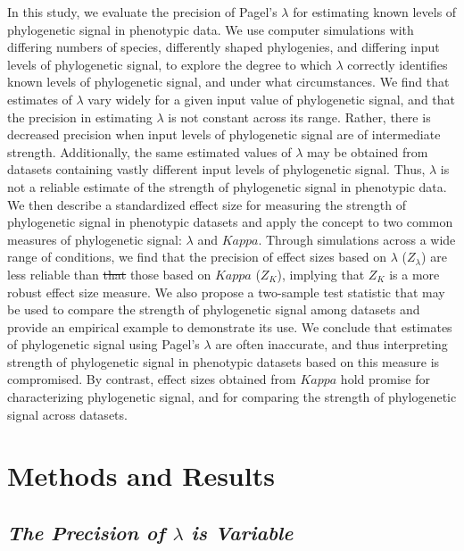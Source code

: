 \documentclass[
]{article}
\begin{document}
In this study, we evaluate the precision of Pagel's \(\lambda\) for
estimating known levels of phylogenetic signal in phenotypic data. We
use computer simulations with differing numbers of species, differently
shaped phylogenies, and differing input levels of phylogenetic signal,
to explore the degree to which \(\lambda\) correctly identifies known
levels of phylogenetic signal, and under what circumstances. We find
that estimates of \(\lambda\) vary widely for a given input value of
phylogenetic signal, and that the precision in estimating \(\lambda\) is
not constant across its range. Rather, there is decreased precision when
input levels of phylogenetic signal are of intermediate strength.
Additionally, the same estimated values of \(\lambda\) may be obtained
from datasets containing vastly different input levels of phylogenetic
signal. Thus, \(\lambda\) is not a reliable estimate of the strength of
phylogenetic signal in phenotypic data. We then describe a standardized
effect size for measuring the strength of phylogenetic signal in
phenotypic datasets and apply the concept to two common measures of
phylogenetic signal: \(\lambda\) and \(Kappa\). Through simulations
across a wide range of conditions, we find that the precision of effect
sizes based on \(\lambda\) (\(Z_{\lambda}\)) are less reliable than
\sout{that} those based on \(Kappa\) (\(Z_K\)), implying that \(Z_K\) is
a more robust effect size measure. We also propose a two-sample test
statistic that may be used to compare the strength of phylogenetic
signal among datasets and provide an empirical example to demonstrate
its use. We conclude that estimates of phylogenetic signal using Pagel's
\(\lambda\) are often inaccurate, and thus interpreting strength of
phylogenetic signal in phenotypic datasets based on this measure is
compromised. By contrast, effect sizes obtained from \(Kappa\) hold
promise for characterizing phylogenetic signal, and for comparing the
strength of phylogenetic signal across datasets.

\hypertarget{methods-and-results}{%
\section{Methods and Results}\label{methods-and-results}}

\hypertarget{the-precision-of-lambda-is-variable}{%
\subsection{\texorpdfstring{\emph{The Precision of \(\lambda\) is
Variable}}{The Precision of \textbackslash lambda is Variable}}\label{the-precision-of-lambda-is-variable}}
\end{document}
